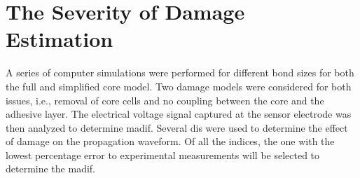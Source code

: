 \chapter[The Severity of Damage Estimation]{The Severity of Damage Estimation}
\label{ch:severity}

A series of computer simulations were performed for different bond sizes for both the full and simplified core model.
Two damage models were considered for both issues, i.e., removal of core cells and no coupling between the core and the adhesive layer.
The electrical voltage signal captured at the sensor electrode was then analyzed to determine \ac{madif}.
Several \acp{di} were used to determine the effect of damage on the propagation waveform.
Of all the indices, the one with the lowest percentage error to experimental measurements will be selected to determine the \ac{madif}.

%
%
%
%